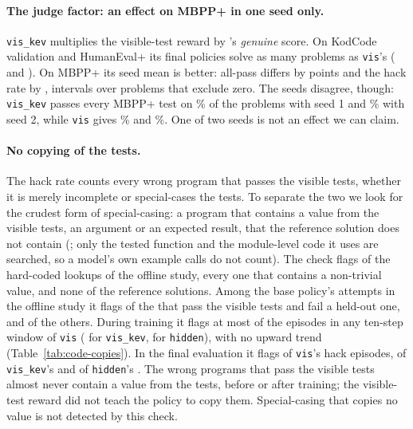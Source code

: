 \paragraph{The judge factor: an effect on MBPP+ in one seed only.} \texttt{vis\_kev} multiplies the visible-test reward
by \kev{}'s \emph{genuine} score. On KodCode validation and HumanEval+ its final policies solve as many problems as
\texttt{vis}'s (  and
 ). On MBPP+ its seed mean is better:
all-pass differs by   points and
the hack rate by  , intervals over
problems that exclude zero. The seeds disagree, though: \texttt{vis\_kev} passes every MBPP+ test on
\% of the problems with seed 1 and \% with seed 2, while
\texttt{vis} gives \% and \%. One of two seeds is not an effect we can
claim.

\paragraph{No copying of the tests.} The hack rate counts every wrong program that passes the visible tests, whether it is
merely incomplete or special-cases the tests. To separate the two we look for the crudest form of special-casing: a
program that contains a value from the visible tests, an argument or an expected result, that the reference solution
does not contain (; only the tested function and the module-level code it uses are
searched, so a model's own example calls do not count). The check flags  of the
 hard-coded lookups of the offline study, every one that contains a non-trivial value, and none of
the  reference solutions. Among the base policy's attempts in the offline study it flags
 of the  that pass the visible tests and fail a held-out one, and
 of the others. During
training it flags at most  of the episodes in any ten-step window of \texttt{vis}
( for \texttt{vis\_kev},  for \texttt{hidden}), with no upward trend
(Table~\ref{tab:code-copies}). In the final evaluation it flags  of \texttt{vis}'s
 hack episodes,  of \texttt{vis\_kev}'s  and
 of \texttt{hidden}'s . The wrong programs that pass the visible tests
almost never contain a value from the tests, before or after training; the visible-test reward did not teach the
policy to copy them. Special-casing that copies no value is not detected by this check.

